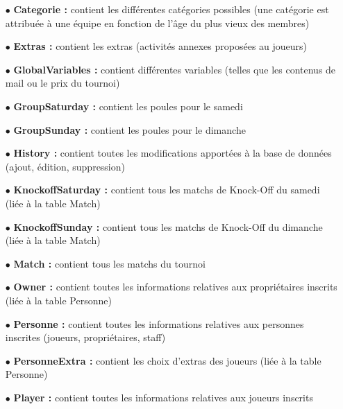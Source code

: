 \documentclass{article}
\begin{document}
\begin{itemize}
\item[$\bullet$]{\textbf{Categorie :}} contient les différentes catégories possibles (une catégorie est attribuée
 à une équipe en fonction de l’âge du plus vieux des membres)

\item[$\bullet$]{\textbf{Extras :}} contient les extras (activités annexes proposées au joueurs)

\item[$\bullet$]{\textbf{GlobalVariables :}} contient différentes variables (telles que les contenus de mail ou le prix du tournoi)

\item[$\bullet$]{\textbf{GroupSaturday :}} contient les poules pour le samedi

\item[$\bullet$]{\textbf{GroupSunday :}} contient les poules pour le dimanche

\item[$\bullet$]{\textbf{History  :}}  contient  toutes  les  modifications  apportées  à  la  base  de  données (ajout, édition, suppression)

\item[$\bullet$]{\textbf{KnockoffSaturday :}} contient tous les matchs de Knock-Off du samedi (liée à la table Match)

\item[$\bullet$]{\textbf{KnockoffSunday  :}}  contient  tous  les  matchs  de  Knock-Off  du  dimanche  (liée  à  la table Match)

\item[$\bullet$]{\textbf{Match :}} contient tous les matchs du tournoi

\item[$\bullet$]{\textbf{Owner :}} contient toutes les informations relatives aux propriétaires inscrits (liée à la table Personne)

\item[$\bullet$]{\textbf{Personne  :}}  contient  toutes  les  informations  relatives  aux  personnes  inscrites (joueurs, propriétaires, staff)

\item[$\bullet$]{\textbf{PersonneExtra :}} contient les choix d’extras des joueurs (liée à la table Personne)

\item[$\bullet$]{\textbf{Player :}} contient toutes les informations relatives aux joueurs inscrits


\end{itemize}
\end{document}
